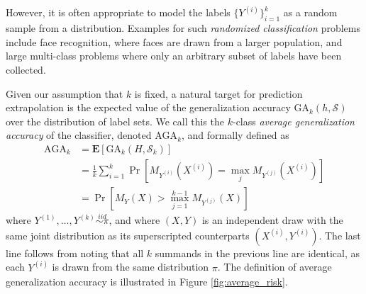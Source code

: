\documentclass[twoside,11pt]{article}
\newcommand{\E}{\textbf{E}}
\begin{document}
However, it is often appropriate to model the labels $\{Y^{(i)}\}_{i=1}^k$
 as a random sample from a distribution.
Examples for such \emph{randomized classification} problems include face recognition, where faces are drawn from a larger population, and large multi-class problems where only an arbitrary subset of labels have been collected.

Given our assumption that $k$ is fixed, a natural target for prediction extrapolation is the expected value of the generalization accuracy $\text{GA}_k(h, \mathcal{S})$ over the distribution of label sets.  We call this the $k$-class \emph{average generalization accuracy} of the
classifier, denoted $\text{AGA}_k$, and formally defined as
\begin{align*}
\text{AGA}_k &= \E[\text{GA}_k(H, \mathcal{S}_k)]
\\&= \frac{1}{k} \sum_{i=1}^k \Pr[M_{Y^{(i)}}(X^{(i)}) = \max_j
M_{Y^{(j)}}(X^{(i)})]
\\&= \Pr[M_{Y}(X) > \max_{j=1}^{k-1} M_{Y^{(j)}}(X)]
\end{align*}
where $Y^{(1)}, \hdots, Y^{(k)} \stackrel{iid}{\sim
  \pi}$, and where $(X,Y)$ is an independent draw with the same joint distribution as its superscripted counterparts $(X^{(i)}, Y^{(i)})$. %
The last line follows from noting that all $k$ summands in the
previous line are identical, as each $Y^{(i)}$ is drawn from the same distribution $\pi$.  %
The definition of average generalization accuracy is illustrated in Figure
  \ref{fig:average_risk}.
\end{document}

